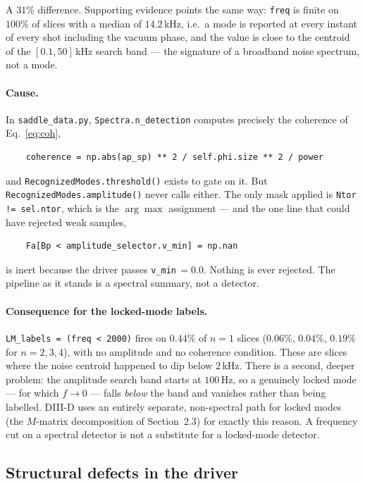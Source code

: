 \documentclass[11pt,a4paper]{article}
\newcommand{\code}[1]{\texttt{\small #1}}
\begin{document}
A $31\%$ difference. Supporting evidence points the same way: \code{freq} is finite on
$100\%$ of slices with a median of $14.2$\,kHz, i.e.\ a mode is reported at every instant
of every shot including the vacuum phase, and the value is close to the centroid of the
$[0.1, 50]$\,kHz search band --- the signature of a broadband noise spectrum, not a mode.

\paragraph{Cause.} In \code{saddle\_data.py}, \code{Spectra.n\_detection} computes
precisely the coherence of Eq.~\eqref{eq:coh},
\begin{verbatim}
    coherence = np.abs(ap_sp) ** 2 / self.phi.size ** 2 / power
\end{verbatim}
and \code{RecognizedModes.threshold()} exists to gate on it. But
\code{RecognizedModes.amplitude()} never calls either. The only mask applied is
\code{Ntor != sel.ntor}, which is the $\arg\max$ assignment --- and the one line that could
have rejected weak samples,
\begin{verbatim}
    Fa[Bp < amplitude_selector.v_min] = np.nan
\end{verbatim}
is inert because the driver passes \code{v\_min}$\,=0.0$. Nothing is ever rejected. The
pipeline as it stands is a spectral summary, not a detector.

\paragraph{Consequence for the locked-mode labels.} \code{LM\_labels = (freq < 2000)}
fires on $0.44\%$ of $n=1$ slices ($0.06\%$, $0.04\%$, $0.19\%$ for $n=2,3,4$), with no
amplitude and no coherence condition. These are slices where the noise centroid happened
to dip below $2$\,kHz. There is a second, deeper problem: the amplitude search band starts
at $100$\,Hz, so a genuinely locked mode --- for which $f \to 0$ --- falls \emph{below} the
band and vanishes rather than being labelled. DIII-D uses an entirely separate, non-spectral
path for locked modes (the $M$-matrix decomposition of Section~2.3) for exactly this
reason. A frequency cut on a spectral detector is not a substitute for a locked-mode
detector.

\subsection{Structural defects in the driver}
\end{document}

